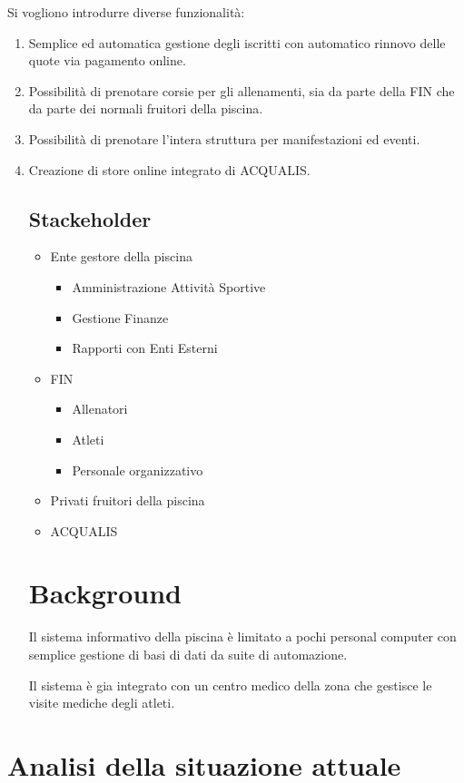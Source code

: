\documentclass[11pt]{article} %
\begin{document}
Si vogliono introdurre diverse funzionalità:
\begin{enumerate}
	\item Semplice ed automatica gestione degli iscritti con automatico rinnovo delle quote via pagamento online. 
	\item Possibilità di prenotare corsie per gli allenamenti, sia da parte della FIN che da parte dei normali fruitori della piscina.
	\item Possibilità di prenotare l'intera struttura per manifestazioni ed eventi.
	\item Creazione di store online integrato di ACQUALIS.
\subsection{Stackeholder}

\begin{itemize}
	\item Ente gestore della piscina
	\begin{itemize}
		\item Amministrazione Attività Sportive
		\item Gestione Finanze
		\item Rapporti con Enti Esterni
	\end{itemize}
	\item FIN
	\begin{itemize}
		\item Allenatori
		\item Atleti
		\item Personale organizzativo
	\end{itemize}
	\item Privati fruitori della piscina
	\item ACQUALIS
\end{itemize}


\section{Background}

Il sistema informativo della piscina è limitato a pochi personal computer con semplice gestione di basi di dati da suite di automazione.

Il sistema è gia integrato con un centro medico della zona che gestisce le visite mediche degli atleti.

\end{enumerate}

\section{Analisi della situazione attuale}
\end{document}
